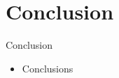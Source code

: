 
\section{Conclusion}
\begin{frame}{Conclusion}
\begin{itemize}
\item Conclusions
\end{itemize}
\end{frame}